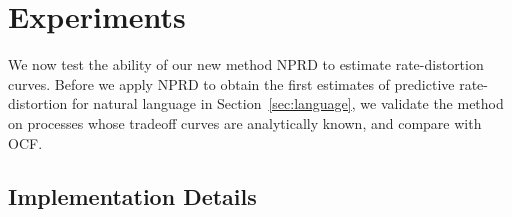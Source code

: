 \documentclass[entropy,article,submit,moreauthors,pdftex,10pt,a4paper]{Definitions/mdpi}
\begin{document}
\section{Experiments}\label{sec:experiments}
We now test the ability of our new method NPRD to estimate rate-distortion curves.
Before we apply NPRD to obtain the first estimates of predictive rate-distortion for natural language in Section~\ref{sec:language}, we validate the method on processes whose tradeoff curves are analytically known, and compare with OCF.

\subsection{Implementation Details}
\end{document}
